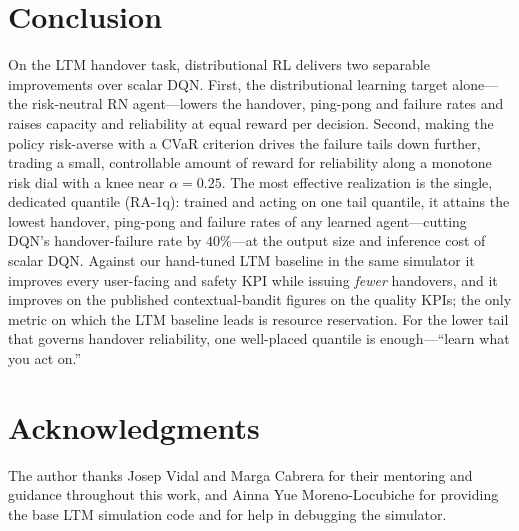 \documentclass[conference]{IEEEtran}
\begin{document}
\section{Conclusion}
\label{sec:conclusion}
On the LTM handover task, distributional RL delivers two separable improvements
over scalar DQN. First, the distributional learning target alone---the
risk-neutral RN agent---lowers the handover, ping-pong and failure rates and
raises capacity and reliability at equal reward per decision. Second, making the
policy risk-averse with a CVaR criterion drives the failure tails down further,
trading a small, controllable amount of reward for reliability along a monotone
risk dial with a knee near $\alpha=0.25$. The most effective realization is the
single, dedicated quantile (RA-1q): trained and acting on one tail quantile, it
attains the lowest handover, ping-pong and failure rates of any learned
agent---cutting DQN's handover-failure rate by $40\%$---at the output size and
inference cost of scalar DQN. Against our hand-tuned LTM baseline in the same
simulator it improves every user-facing and safety KPI while issuing \emph{fewer}
handovers, and it improves on the published contextual-bandit figures on the
quality KPIs; the only metric on which the LTM baseline leads is resource
reservation. For the lower tail that governs handover reliability, one well-placed
quantile is enough---``learn what you act on.''

\section*{Acknowledgments}
The author thanks Josep Vidal and Marga Cabrera for their mentoring and
guidance throughout this work, and Ainna Yue Moreno-Locubiche for providing the
base LTM simulation code and for help in debugging the simulator.
\end{document}
